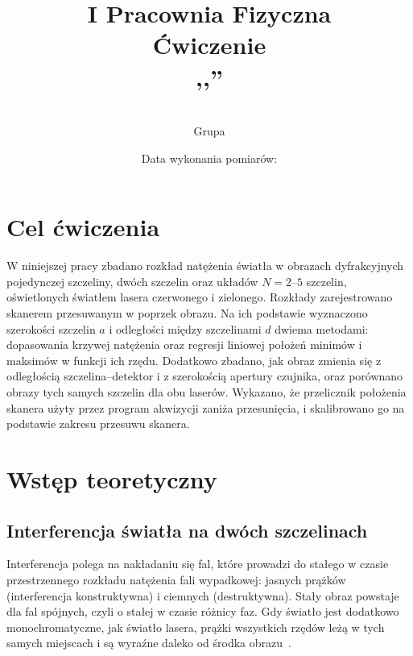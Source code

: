 \documentclass[12pt, a4paper]{article}
\title{
    \large I Pracownia Fizyczna \\[0.5em]
    \textbf{Ćwiczenie \nrCwiczenia} \\[0.3em]
    \LARGE \tytul\space,,\codeword''
}
\author{
    \autor\\
     Grupa \nrGrupy}
\date{
    Data wykonania pomiarów: \dataWykonania\\
}
\begin{document}

\maketitle
\thispagestyle{empty}
\newpage

\section{Cel ćwiczenia}

W niniejszej pracy zbadano rozkład natężenia światła w obrazach dyfrakcyjnych pojedynczej
szczeliny, dwóch szczelin oraz układów $N = 2$--$5$ szczelin, oświetlonych światłem
lasera czerwonego i zielonego. Rozkłady zarejestrowano skanerem przesuwanym w poprzek
obrazu. Na ich podstawie wyznaczono szerokości szczelin $a$ i odległości między szczelinami
$d$ dwiema metodami: dopasowania krzywej natężenia oraz regresji liniowej położeń minimów
i maksimów w funkcji ich rzędu. Dodatkowo zbadano, jak obraz zmienia się z odległością
szczelina--detektor i z szerokością apertury czujnika, oraz porównano obrazy tych samych
szczelin dla obu laserów. Wykazano, że przelicznik położenia skanera użyty przez program
akwizycji zaniża przesunięcia, i skalibrowano go na podstawie zakresu przesuwu skanera.

\section{Wstęp teoretyczny}

\subsection{Interferencja światła na dwóch szczelinach}

Interferencja polega na nakładaniu się fal, które prowadzi do stałego w czasie
przestrzennego rozkładu natężenia fali wypadkowej: jasnych prążków (interferencja
konstruktywna) i ciemnych (destruktywna). Stały obraz powstaje dla fal spójnych, czyli
o stałej w czasie różnicy faz. Gdy światło jest dodatkowo monochromatyczne, jak światło
lasera, prążki wszystkich rzędów leżą w tych samych miejscach i są wyraźne daleko od środka
obrazu~\cite{skrypt}.
\end{document}
